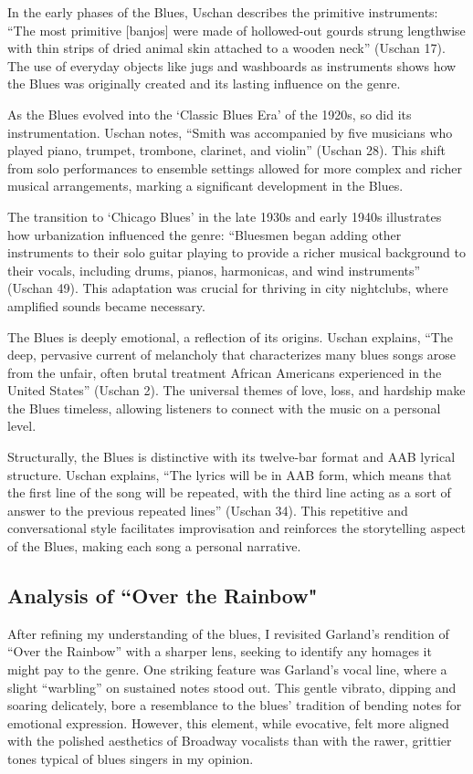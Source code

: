 \documentclass[12pt]{article}
\begin{document}
In the early phases of the Blues, Uschan describes the primitive instruments: “The most primitive [banjos] were made of hollowed-out gourds strung lengthwise with thin strips of dried animal skin attached to a wooden neck” (Uschan 17). The use of everyday objects like jugs and washboards as instruments shows how the Blues was originally created and its lasting influence on the genre.

As the Blues evolved into the `Classic Blues Era' of the 1920s, so did its instrumentation. Uschan notes, “Smith was accompanied by five musicians who played piano, trumpet, trombone, clarinet, and violin” (Uschan 28). This shift from solo performances to ensemble settings allowed for more complex and richer musical arrangements, marking a significant development in the Blues.

The transition to `Chicago Blues' in the late 1930s and early 1940s illustrates how urbanization influenced the genre: “Bluesmen began adding other instruments to their solo guitar playing to provide a richer musical background to their vocals, including drums, pianos, harmonicas, and wind instruments” (Uschan 49). This adaptation was crucial for thriving in city nightclubs, where amplified sounds became necessary.

The Blues is deeply emotional, a reflection of its origins. Uschan explains, “The deep, pervasive current of melancholy that characterizes many blues songs arose from the unfair, often brutal treatment African Americans experienced in the United States” (Uschan 2). The universal themes of love, loss, and hardship make the Blues timeless, allowing listeners to connect with the music on a personal level.

Structurally, the Blues is distinctive with its twelve-bar format and AAB lyrical structure. Uschan explains, “The lyrics will be in AAB form, which means that the first line of the song will be repeated, with the third line acting as a sort of answer to the previous repeated lines” (Uschan 34). This repetitive and conversational style facilitates improvisation and reinforces the storytelling aspect of the Blues, making each song a personal narrative.

\subsection*{Analysis of ``Over the Rainbow"}

After refining my understanding of the blues, I revisited Garland’s rendition of “Over the Rainbow” with a sharper lens, seeking to identify any homages it might pay to the genre. One striking feature was Garland’s vocal line, where a slight “warbling” on sustained notes stood out. This gentle vibrato, dipping and soaring delicately, bore a resemblance to the blues’ tradition of bending notes for emotional expression. However, this element, while evocative, felt more aligned with the polished aesthetics of Broadway vocalists than with the rawer, grittier tones typical of blues singers in my opinion.
\end{document}
